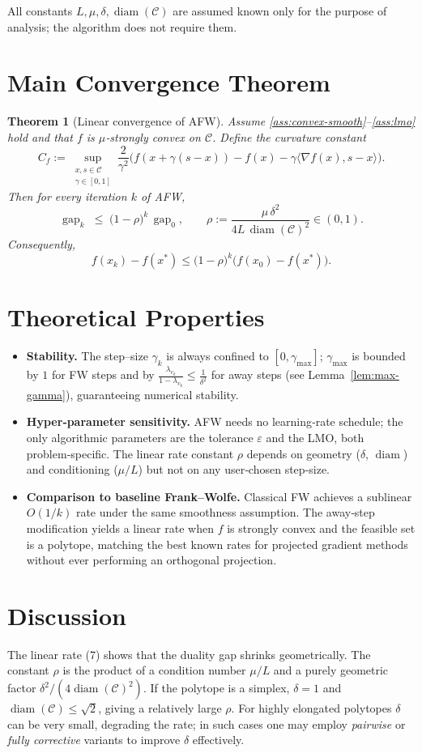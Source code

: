 \documentclass{article}
\newtheorem{theorem}{Theorem}
\newcommand{\C}{\mathcal{C}}
\newcommand{\gap}{\operatorname{gap}}
\newcommand{\diam}{\operatorname{diam}}
\begin{document}
All constants $L,\mu,\delta,\diam(\C)$ are assumed known only for the purpose of analysis; the algorithm does not require them.

\section*{Main Convergence Theorem}
\begin{theorem}[Linear convergence of AFW]
\label{thm:linear}
Assume \ref{ass:convex-smooth}–\ref{ass:lmo} hold and that $f$ is $\mu$‑strongly convex on $\C$.  
Define the curvature constant
\[
C_{f}:=\sup_{\substack{x,s\in\C\\ \gamma\in[0,1]}}
\frac{2}{\gamma^{2}}\bigl(f(x+\gamma(s-x))-f(x)-\gamma\langle\nabla f(x),s-x\rangle\bigr).
\]
Then for every iteration $k$ of AFW,
\[
\gap_{k}\;\le\; \bigl(1-\rho\bigr)^{k}\,\gap_{0},
\qquad
\rho:=\frac{\mu\,\delta^{2}}{4L\,\diam(\C)^{2}} \in (0,1).
\tag{7}
\]
Consequently,
\[
f(x_{k})-f(x^{*})\le \bigl(1-\rho\bigr)^{k}\bigl(f(x_{0})-f(x^{*})\bigr).
\]
\end{theorem}

\section*{Theoretical Properties}
\begin{itemize}
\item \textbf{Stability.} The step–size $\gamma_{k}$ is always confined to $[0,\gamma_{\max}]$; $\gamma_{\max}$ is bounded by $1$ for FW steps and by $\frac{\lambda_{v_{k}}}{1-\lambda_{v_{k}}}\le \frac{1}{\delta^{2}}$ for away steps (see Lemma~\ref{lem:max-gamma}), guaranteeing numerical stability.
\item \textbf{Hyper‑parameter sensitivity.} AFW needs no learning‑rate schedule; the only algorithmic parameters are the tolerance $\varepsilon$ and the LMO, both problem‑specific. The linear rate constant $\rho$ depends on geometry ($\delta$, $\diam$) and conditioning ($\mu/L$) but not on any user‑chosen step‑size.
\item \textbf{Comparison to baseline Frank–Wolfe.} Classical FW achieves a sublinear $O(1/k)$ rate under the same smoothness assumption. The away‑step modification yields a linear rate when $f$ is strongly convex and the feasible set is a polytope, matching the best known rates for projected gradient methods without ever performing an orthogonal projection.
\end{itemize}

\section*{Discussion}
The linear rate (7) shows that the duality gap shrinks geometrically.  
The constant $\rho$ is the product of a condition number $\mu/L$ and a purely geometric factor $\delta^{2}/(4\diam(\C)^{2})$.  
If the polytope is a simplex, $\delta=1$ and $\diam(\C)\le\sqrt{2}$, giving a relatively large $\rho$.  
For highly elongated polytopes $\delta$ can be very small, degrading the rate; in such cases one may employ \emph{pairwise} or \emph{fully corrective} variants to improve $\delta$ effectively.
\end{document}
